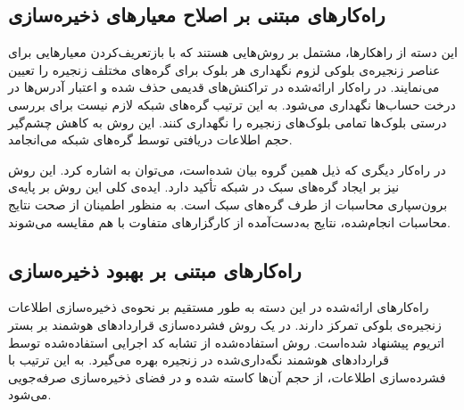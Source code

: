 \subsection{راه‌کارهای مبتنی بر اصلاح معیارهای ذخیره‌سازی}
این دسته از راهکارها، مشتمل بر روش‌هایی هستند که با بازتعریف‌کردن معیارهایی برای عناصر زنجیره‌‌ی بلوکی لزوم نگهداری هر بلوک برای گره‌های مختلف زنجیره را تعیین می‌نمایند. در راه‌کار ارائه‌شده در \cite{Bruce2017} تراکنش‌های قدیمی حذف شده و اعتبار آدرس‌ها در درخت حساب‌ها نگهداری می‌شود. به این ترتیب گره‌های شبکه لازم نیست برای بررسی درستی بلوک‌ها تمامی بلوک‌های زنجیره را نگهداری کنند. این روش به کاهش چشم‌گیر حجم اطلاعات دریافتی توسط گره‌های شبکه می‌انجامد. 

در راه‌کار دیگری که ذیل همین گروه بیان شده‌است، ‌می‌توان به \cite{VanDenHooff2014} اشاره کرد. این روش نیز بر ایجاد گره‌های سبک در شبکه تأکید دارد. ایده‌ی کلی این روش بر پایه‌ی برون‌سپاری محاسبات از طرف گره‌های سبک است. به منظور اطمینان از صحت نتایج محاسبات انجام‌شده، نتایج به‌دست‌آمده از کارگزارهای متفاوت با هم مقایسه می‌شوند.

\subsection{راه‌کارهای مبتنی بر بهبود ذخیره‌سازی}
راه‌کارهای ارائه‌شده در این دسته به طور مستقیم بر نحوه‌ی ذخیره‌سازی اطلاعات زنجیره‌ی بلوکی تمرکز دارند. در \cite{Pontiveros2018} یک روش فشرده‌سازی قراردادهای هوشمند بر بستر اتریوم پیشنهاد شده‌است. روش استفاده‌شده از تشابه کد اجرایی استفاده‌شده توسط قراردادهای هوشمند نگه‌داری‌شده در زنجیره بهره می‌گیرد. به این ترتیب با فشرده‌سازی اطلاعات، از حجم آن‌ها کاسته شده و در فضای ذخیره‌سازی صرفه‌جویی می‌شود.